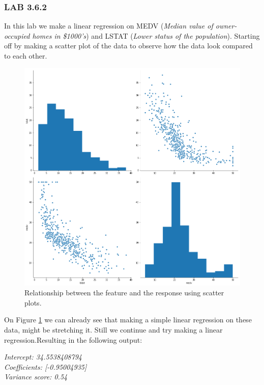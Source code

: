 \subsubsection*{LAB 3.6.2}
In this lab we make a linear regression on MEDV (\textit{Median value of owner-occupied homes in \$1000's}) and LSTAT (\textit{Lower status of the population}). Starting off by making a scatter plot of the data to observe how the data look compared to each other.

\begin{figure}[h]
	\centering
	\includegraphics[scale=0.4, trim=0 0 0 500, clip=true]{regression/multipleLinearRegression/fig/bostonPairplotMdevLstat.png}
	\caption{Relationship between the feature and the response using scatter plots.}
	\label{fig:bostonPairplotMdevLstat}
\end{figure}

On Figure \ref{fig:bostonPairplotMdevLstat} we can already see that making a simple linear regression on these data, might be stretching it. Still we continue and try making a linear regression.Resulting in the following output:

\noindent\textit{Intercept: 34.5538408794\\
Coefficients: [-0.95004935]\\
Variance score: 0.54\\}

